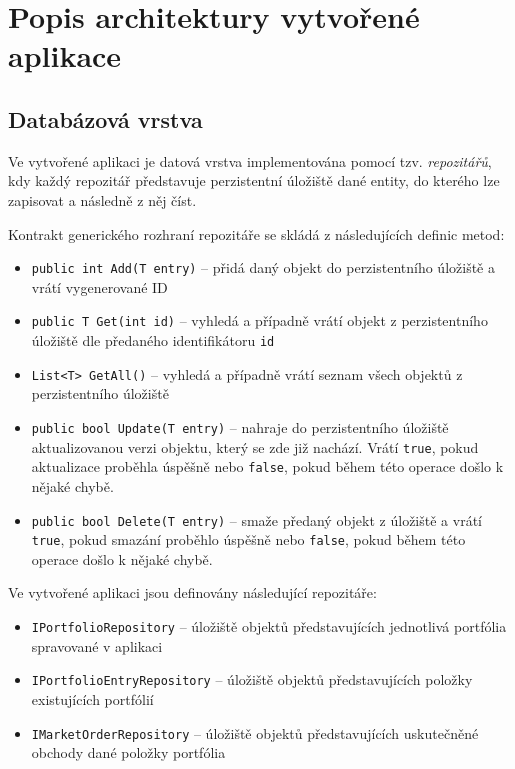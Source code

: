 \documentclass[12pt, a4paper]{article}
\begin{document}
    \section{Popis architektury vytvořené aplikace}

    \subsection{Databázová vrstva}
    Ve vytvořené aplikaci je datová vrstva implementována pomocí tzv. \textit{repozitářů}, kdy každý repozitář představuje perzistentní úložiště dané entity, do kterého lze zapisovat a následně z něj číst.

    Kontrakt generického rozhraní repozitáře se skládá z následujících definic metod:
    \begin{itemize}
        \item \texttt{public int Add(T entry)} -- přidá daný objekt do perzistentního úložiště a vrátí vygenerované ID
        \item \texttt{public T Get(int id)} -- vyhledá a případně vrátí objekt z perzistentního úložiště dle předaného identifikátoru \texttt{id}
        \item \texttt{List<T> GetAll()} -- vyhledá a případně vrátí seznam všech objektů z perzistentního úložiště
        \item \texttt{public bool Update(T entry)} -- nahraje do perzistentního úložiště aktualizovanou verzi objektu, který se zde již nachází. Vrátí \texttt{true}, pokud aktualizace proběhla úspěšně nebo \texttt{false}, pokud během této operace došlo k nějaké chybě.
        \item \texttt{public bool Delete(T entry)} -- smaže předaný objekt z úložiště a vrátí \texttt{true}, pokud smazání proběhlo úspěšně nebo \texttt{false}, pokud během této operace došlo k nějaké chybě.

    \end{itemize}

    \noindent Ve vytvořené aplikaci jsou definovány následující repozitáře:
    \begin{itemize}
        \item \texttt{IPortfolioRepository} -- úložiště objektů představujících jednotlivá portfólia spravované v aplikaci
        \item \texttt{IPortfolioEntryRepository} -- úložiště objektů představujících položky existujících portfólií
        \item \texttt{IMarketOrderRepository} -- úložiště objektů představujících uskutečněné obchody dané položky portfólia
    \end{itemize}
\end{document}
